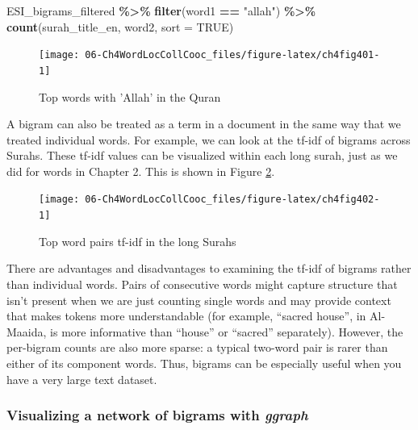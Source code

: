 \documentclass[
]{article}
\newenvironment{Shaded}{\begin{snugshade}}{\end{snugshade}}
\newcommand{\AttributeTok}[1]{\textcolor[rgb]{0.13,0.29,0.53}{#1}}
\newcommand{\ConstantTok}[1]{\textcolor[rgb]{0.56,0.35,0.01}{#1}}
\newcommand{\FunctionTok}[1]{\textcolor[rgb]{0.13,0.29,0.53}{\textbf{#1}}}
\newcommand{\NormalTok}[1]{#1}
\newcommand{\SpecialCharTok}[1]{\textcolor[rgb]{0.81,0.36,0.00}{\textbf{#1}}}
\newcommand{\StringTok}[1]{\textcolor[rgb]{0.31,0.60,0.02}{#1}}
\begin{document}
\footnotesize

\begin{Shaded}
\begin{Highlighting}[]
\NormalTok{ESI\_bigrams\_filtered }\SpecialCharTok{\%\textgreater{}\%}
        \FunctionTok{filter}\NormalTok{(word1 }\SpecialCharTok{==} \StringTok{"allah"}\NormalTok{) }\SpecialCharTok{\%\textgreater{}\%}
        \FunctionTok{count}\NormalTok{(surah\_title\_en, word2, }\AttributeTok{sort =} \ConstantTok{TRUE}\NormalTok{)}
\end{Highlighting}
\end{Shaded}

\begin{figure}

{\centering \texttt{[image: 06-Ch4WordLocCollCooc\_files/figure-latex/ch4fig401-1]} 

}

\caption{Top words with 'Allah' in the Quran}\label{fig:ch4fig401}
\end{figure}
\normalsize

A bigram can also be treated as a term in a document in the same way that we treated individual words. For example, we can look at the tf-idf of bigrams across Surahs. These tf-idf values can be visualized within each long surah, just as we did for words in Chapter 2. This is shown in Figure \ref{fig:ch4fig402}.

\begin{figure}

{\centering \texttt{[image: 06-Ch4WordLocCollCooc\_files/figure-latex/ch4fig402-1]} 

}

\caption{Top word pairs tf-idf in the long Surahs}\label{fig:ch4fig402}
\end{figure}

There are advantages and disadvantages to examining the tf-idf of bigrams rather than individual words. Pairs of consecutive words might capture structure that isn't present when we are just counting single words and may provide context that makes tokens more understandable (for example, ``sacred house'', in Al-Maaida, is more informative than ``house'' or ``sacred'' separately). However, the per-bigram counts are also more sparse: a typical two-word pair is rarer than either of its component words. Thus, bigrams can be especially useful when you have a very large text dataset.

\hypertarget{visualizing-a-network-of-bigrams-with-ggraph}{%
\subsubsection{\texorpdfstring{Visualizing a network of bigrams with \emph{ggraph}}{Visualizing a network of bigrams with ggraph}}\label{visualizing-a-network-of-bigrams-with-ggraph}}
\end{document}
